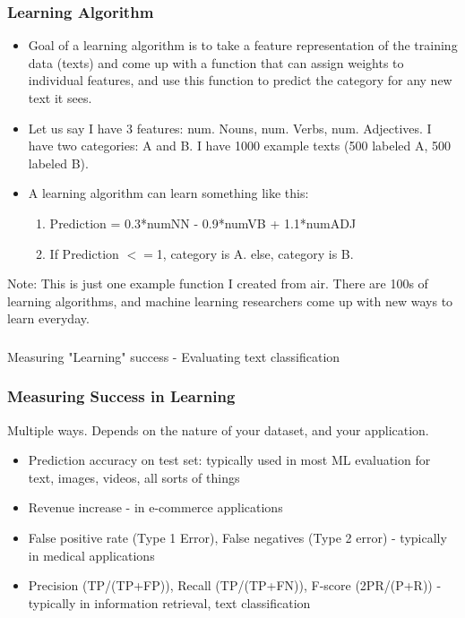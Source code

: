 \documentclass{beamer}
\begin{document}
\begin{frame}
\frametitle{Learning Algorithm}
\begin{itemize}
\item Goal of a learning algorithm is to take a feature representation of the training data (texts) and come up with a function that can assign weights to individual features, and use this function to predict the category for any new text it sees. 
\item Let us say I have 3 features: num. Nouns, num. Verbs, num. Adjectives. I have two categories: A and B. I have 1000 example texts (500 labeled A, 500 labeled B).
\item A learning algorithm can learn something like this: 
\begin{enumerate}
\item Prediction = 0.3*numNN - 0.9*numVB + 1.1*numADJ
\item If Prediction $<=$1, category is A. else, category is B.
\end{enumerate}
\end{itemize}
Note: This is just one example function I created from air. There are 100s of learning algorithms, and machine learning researchers come up with new ways to learn everyday.
\end{frame}

\begin{frame}
\frametitle{}
\begin{center}
\Large Measuring "Learning" success - Evaluating text classification
\end{center}
\end{frame}

\begin{frame}
\frametitle{Measuring Success in Learning}
Multiple ways. Depends on the nature of your dataset, and your application.
\begin{itemize}
\item Prediction accuracy on test set: typically used in most ML evaluation for text, images, videos, all sorts of things
\item Revenue increase - in e-commerce applications
\item False positive rate (Type 1 Error), False negatives (Type 2 error) - typically in medical applications
\item Precision (TP/(TP+FP)), Recall (TP/(TP+FN)), F-score (2PR/(P+R)) - typically in information retrieval, text classification
\end{itemize}
\end{frame}
\end{document}
